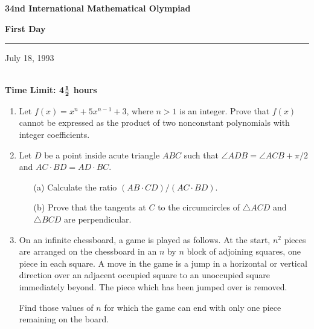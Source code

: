 \documentclass[12pt]{article}
\begin{document}
\begin{center}
{\bf 34nd International Mathematical Olympiad}\\[.1in]
{\bf First Day \rule[.05in]{.25in}{.01in} July 18, 1993} \\
{\bf Time Limit: 4}${{\bf 1}\over{\bf 2}}$ {\bf
hours}
\end{center}
\begin{enumerate}
\item
Let $f(x) = x^n + 5x^{n-1} + 3$, where $n > 1$ is an integer. Prove that 
$f(x)$ cannot be expressed as the product of two nonconstant polynomials 
with integer coefficients.
\item
Let $D$ be a point inside acute triangle $ABC$ such that $\angle ADB = 
\angle ACB + \pi/2$ and $AC \cdot BD = AD \cdot BC$.
\begin{itemize}
	\item[(a)] Calculate the ratio $(AB \cdot CD)/(AC \cdot BD)$. 

	\item[(b)] Prove that the tangents at $C$ to the circumcircles of 
	$\triangle ACD$ and $\triangle BCD$ are perpendicular.
\end{itemize}
\item
On an infinite chessboard, a game is played as follows. At the start, 
$n^2$ pieces are arranged on the chessboard in an $n$ by $n$ block of 
adjoining squares, one piece in each square. A move in the game is a jump 
in a horizontal or vertical direction over an adjacent occupied square to 
an unoccupied square immediately beyond. The piece which has been jumped 
over is removed.

Find those values of $n$ for which the game can end with only one piece 
remaining on the board.
\end{enumerate}
\end{document}
